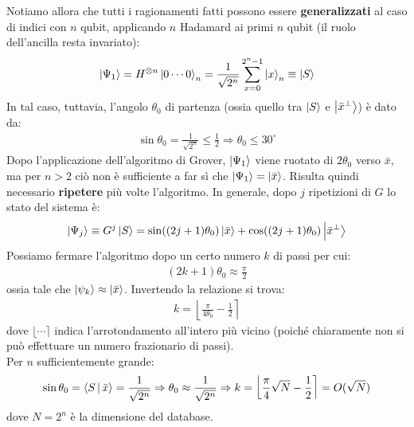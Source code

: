 \documentclass[../../InformazioneQuantistica.tex]{subfiles}
\begin{document}
Notiamo allora che tutti i ragionamenti fatti possono essere \textbf{generalizzati} al caso di indici con $n$ qubit, applicando $n$ Hadamard ai primi $n$ qubit (il ruolo dell'ancilla resta invariato):
\begin{align*}
    \Ket{\Psi_1} = H^{\otimes n} \Ket{0\cdots 0}_n = \frac{1}{\sqrt{2^n}} \sum_{x=0}^{2^n-1} \Ket{x}_n \equiv \Ket{S}
\end{align*}
In tal caso, tuttavia, l'angolo $\theta_0$ di partenza (ossia quello tra $\Ket{S}$ e $\Ket{\bar{x}^\perp}$) è dato da:
\begin{align*}
    \sin\theta_0 = \frac{1}{\sqrt{2^n}} \leq \frac{1}{2} \Rightarrow \theta_0 \leq 30^\circ
\end{align*}
Dopo l'applicazione dell'algoritmo di Grover, $\Ket{\Psi_1}$ viene ruotato di $2\theta_0$ verso $\bar{x}$, ma per $n>2$ ciò non è sufficiente a far sì che $\Ket{\Psi_1} = \Ket{\bar{x}}$. Risulta quindi necessario \textbf{ripetere} più volte l'algoritmo. In generale, dopo $j$ ripetizioni di $G$ lo stato del sistema è:
\begin{align}
    \Ket{\Psi_j} \equiv G^j \Ket{S} = \sin((2j+1)\theta_0)\Ket{\bar{x}} + \cos((2j+1)\theta_0)\Ket{\bar{x}^\perp}
    \label{eqn:Gj}
\end{align}
Possiamo fermare l'algoritmo dopo un certo numero $k$ di passi per cui:
\begin{align*}
    (2k+1)\theta_0 \approx \frac{\pi}{2}
\end{align*}
ossia tale che $\Ket{\psi_k} \approx \Ket{\bar{x}}$. Invertendo la relazione si trova:
\begin{align*}
    k = \left \lfloor \frac{\pi}{4\theta_0} - \frac{1}{2} \right \rceil 
\end{align*}
dove $\lfloor \cdots \rceil$ indica l'arrotondamento all'intero più vicino (poiché chiaramente non si può effettuare un numero frazionario di passi).\\
Per $n$ sufficientemente grande:
\begin{align*}
    \sin \theta_0 = \Braket{S|\bar{x}} = \frac{1}{\sqrt{2^n}} \Rightarrow \theta_0 \approx \frac{1}{\sqrt{2^n}} \Rightarrow k=\left \lfloor \frac{\pi}{4} \sqrt{N} - \frac{1}{2} \right \rceil = O(\sqrt{N})
\end{align*}
dove $N=2^n$ è la dimensione del database.\\
\end{document}

